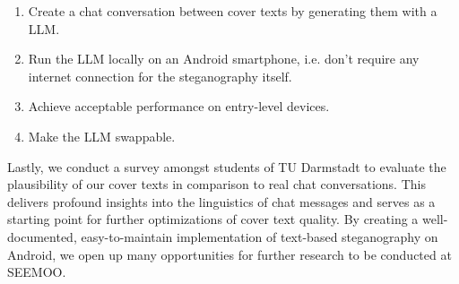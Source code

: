 \begin{enumerate}
    \item Create a chat conversation between cover texts by generating them with a \gls{LLM}.
    \item Run the \gls{LLM} locally on an Android smartphone, i.e. don't require any internet connection for the steganography itself.
    \item Achieve acceptable performance on entry-level devices.
    \item Make the \gls{LLM} swappable.
\end{enumerate}

Lastly, we conduct a survey amongst students of TU Darmstadt to evaluate the plausibility of our cover texts in comparison to real chat conversations. This delivers profound insights into the linguistics of chat messages and serves as a starting point for further optimizations of cover text quality. By creating a well-documented, easy-to-maintain implementation of text-based steganography on Android, we open up many opportunities for further research to be conducted at SEEMOO.
